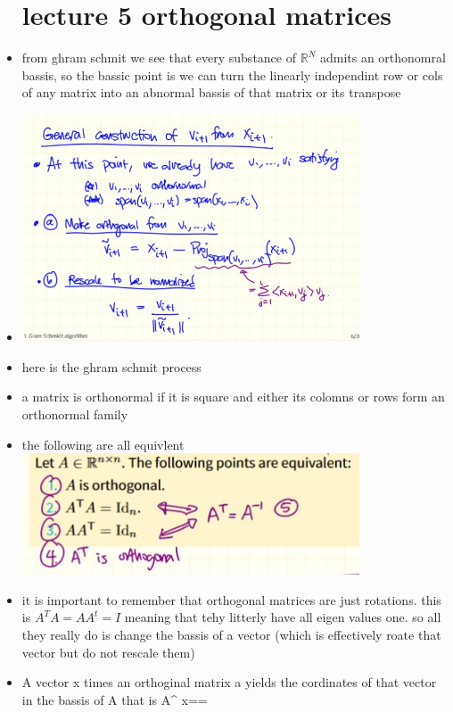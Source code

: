 \documentclass[12pt,twoside]{article}
\begin{document}
\begin{itemize}
\section{lecture 5 orthogonal matrices}
\item from ghram schmit we see that every substance of $\mathbb{R}^N$ admits an orthonomral bassis, so the bassic point is we can turn the linearly independint row  or cols of any matrix into an abnormal bassis of that matrix or its transpose 
\item  \includegraphics[width=10cm]{final Review/gm.jpg}
\item here is the ghram schmit process
\item {} a matrix is orthonormal if it is square and either its colomns or rows form an orthonormal family
\item  the following are all equivlent \includegraphics[width=10cm]{final Review/Orthognial equiv.jpg}
\item it is important to remember that orthogonal matrices are just rotations. this is $A^TA=AA^t=I$ meaning that tehy litterly have all eigen values one. so all they really do is change the bassis of a vector (which is effectively roate that vector but do not rescale them)
\item A vector x times an orthoginal matrix a yields the cordinates of that vector in the bassis of A that is A^{\top} x==



\end{itemize}
\end{document}
